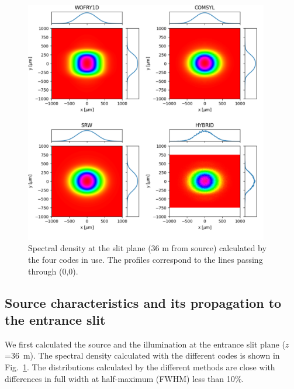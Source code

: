 \documentclass[preprint]{iucr}
\begin{document}
\begin{figure}
    \label{fig:plot_2D_spectral_density_36m}
    \includegraphics[width=0.95\textwidth]{figures/plot_2D_spectral_density_36m.pdf}
    \caption{Spectral density at the slit plane (36 m from source) calculated by the four codes in use. The profiles correspond to the lines passing through (0,0).
    }
\end{figure}

\subsection{Source characteristics and its propagation to the entrance slit}
\label{sec:results36m}

We first calculated the source and the illumination at the entrance slit plane ($z$=\SI{36}{\meter}).
The spectral density calculated with the different codes is shown in Fig.~\ref{fig:plot_2D_spectral_density_36m}. The distributions calculated by the different methods are close with differences in full width at half-maximum (FWHM) less than 10\%.
\end{document}
